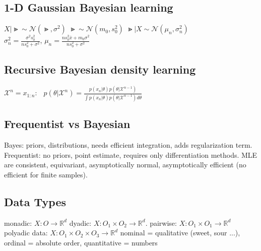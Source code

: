 \subsection*{1-D Gaussian Bayesian learning}
$X|\Gt \sim \mathcal{N}(\Gt, \sigma^2)$ $\Gt \sim \mathcal{N}(m_0, s_0^2)$
$\Gt| X {\sim} \mathcal{N}(\mu_n, \sigma_n^2)$\\
$\sigma_n^2 = \frac{\sigma^2 s_0^2}{ns_0^2 + \sigma^2}$, \quad
$ \mu_n = \frac{ns_0^2\bar{x} + m_0\sigma^2}{ns_0^2 + \sigma^2}$ 

\subsection*{Recursive Bayesian density learning}
$\mathcal{X}^n=x_{1:n}:\ \ $
$p(\theta{|}\mathcal{X}^n){=}\frac{p(x_n|\theta)p(\theta|\mathcal{X}^{n-1})}{\int p(x_n|\theta)p(\theta|\mathcal{X}^{n-1}) d\theta}$


\subsection*{Frequentist vs Bayesian}
Bayes: priors, distributions, needs efficient integration, adds regularization term. \\
Frequentist: no priors, point estimate, requires only differentiation methods. MLE are consistent, equivariant, asymptotically normal, asymptotically efficient (no efficient for finite samples). 

\subsection*{Data Types}
monadic: $X{:} O {\rightarrow} \mathbb{R}^d$ 
dyadic: $X{:} O_1 {\times} O_2 \rightarrow \mathbb{R}^d $.
pairwise: $X{:} O_1 {\times} O_1 {\rightarrow} \mathbb{R}^d$ 
polyadic data: $X{:} O_1 {\times} O_2 {\times} O_3 {\rightarrow} \mathbb{R}^d $ 
nominal = qualitative (sweet, sour ...),
ordinal = absolute order, 
quantitative = numbers